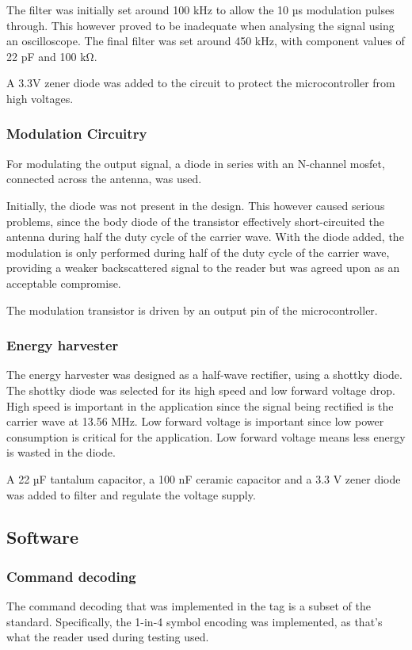 The filter was initially set around 100 kHz to allow the 10 µs modulation pulses\cite{rfid-iso} through.
This however proved to be inadequate when analysing the signal using an oscilloscope.
The final filter was set around 450 kHz, with component values of 22 pF and 100 kΩ.

A 3.3V zener diode was added to the circuit to protect the microcontroller from high voltages.

\subsubsection{Modulation Circuitry}
For modulating the output signal, a diode in series with an N-channel mosfet, connected across the antenna, was used.

Initially, the diode was not present in the design.
This however caused serious problems, since the body diode of the transistor effectively short-circuited the antenna during half the duty cycle of the carrier wave.
With the diode added, the modulation is only performed during half of the duty cycle of the carrier wave, providing a weaker backscattered signal to the reader but was agreed upon as an acceptable compromise.

The modulation transistor is driven by an output pin of the microcontroller.

\subsubsection{Energy harvester}
The energy harvester was designed as a half-wave rectifier, using a shottky diode.
The shottky diode was selected for its high speed and low forward voltage drop.
High speed is important in the application since the signal being rectified is the carrier wave at 13.56 MHz.
Low forward voltage is important since low power consumption is critical for the application.
Low forward voltage means less energy is wasted in the diode.

A 22 µF tantalum capacitor, a 100 nF ceramic capacitor and a 3.3 V zener diode was added to filter and regulate the voltage supply.

\subsection{Software}

\subsubsection{Command decoding}
The command decoding that was implemented in the tag is a subset of the standard. Specifically, the
1-in-4 symbol encoding was implemented, as that's what the reader used during testing used.

